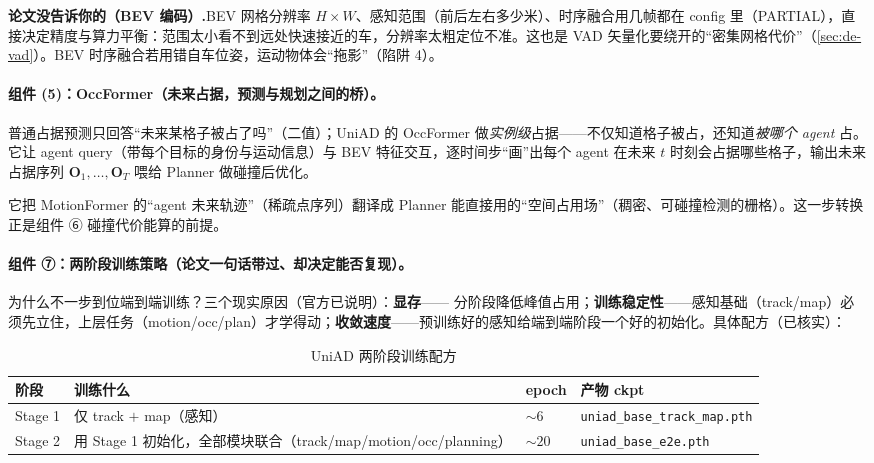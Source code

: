 \begin{note}
\textbf{论文没告诉你的（BEV 编码）.}\;BEV 网格分辨率 $H\times W$、感知范围（前后左右多少米）、时序融合用几帧都在 config 里（PARTIAL），直接决定精度与算力平衡：范围太小看不到远处快速接近的车，分辨率太粗定位不准。这也是 VAD 矢量化要绕开的“密集网格代价”（\cref{sec:de-vad}）。BEV 时序融合若用错自车位姿，运动物体会“拖影”（陷阱 4）。
\end{note}

\paragraph{组件 (5)：OccFormer（未来占据，预测与规划之间的桥）。}
普通占据预测只回答“未来某格子被占了吗”（二值）；UniAD 的 OccFormer 做\emph{实例级}占据——不仅知道格子被占，还知道\emph{被哪个 agent} 占。它让 agent query（带每个目标的身份与运动信息）与 BEV 特征交互，逐时间步“画”出每个 agent 在未来 $t$ 时刻会占据哪些格子，输出未来占据序列 $\mathbf{O}_1,\dots,\mathbf{O}_T$ 喂给 Planner 做碰撞后优化。

\begin{insight}
它把 MotionFormer 的“agent 未来轨迹”（稀疏点序列）翻译成 Planner 能直接用的“空间占用场”（稠密、可碰撞检测的栅格）。这一步转换正是组件 ⑥ 碰撞代价能算的前提。
\end{insight}

\paragraph{组件 ⑦：两阶段训练策略（论文一句话带过、却决定能否复现）。}
为什么不一步到位端到端训练？三个现实原因（官方已说明）：\textbf{显存}——%
%
分阶段降低峰值占用；\textbf{训练稳定性}——感知基础（track/map）必须先立住，上层任务（motion/occ/plan）才学得动；\textbf{收敛速度}——预训练好的感知给端到端阶段一个好的初始化。具体配方（已核实）：

\begin{table}[H]\centering\small
\caption{UniAD 两阶段训练配方}
\label{tab:de-uniad-stages}
\begin{tabular}{p{} p{} p{} p{}}
\toprule
阶段 & 训练什么 & epoch & 产物 ckpt \\
\midrule
Stage 1 & 仅 track $+$ map（感知） & $\sim 6$ & \texttt{uniad\_base\_track\_map.\allowbreak pth} \\
Stage 2 & 用 Stage 1 初始化，全部模块联合（track/map/motion/occ/planning） & $\sim 20$ & \texttt{uniad\_base\_e2e.\allowbreak pth} \\
\bottomrule
\end{tabular}
\end{table}

